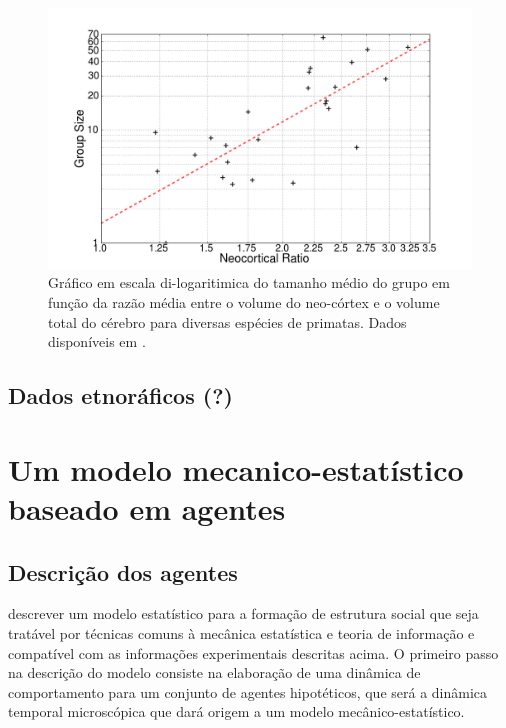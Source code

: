 \begin{figure}
	\centering
	\includegraphics[width = 1.1\textwidth]{figuras/dunbar.png}
	\caption{ Gráfico em escala di-logaritimica do tamanho médio do grupo em função da razão média entre o volume do neo-córtex e o volume total do cérebro para diversas espécies de primatas. Dados disponíveis em \citep{Dunbar2009}.}
	\label{fig:dunbarlaw}
\end{figure}

\subsection{Dados etnoráficos (?)}
\section{Um modelo mecanico-estatístico baseado em agentes}
\subsection{Descrição dos agentes}

 descrever um modelo estatístico para a formação de estrutura social que seja tratável por técnicas comuns à mecânica estatística e teoria de informação e compatível com as informações experimentais descritas acima. O primeiro passo na descrição do modelo consiste na elaboração de uma dinâmica de comportamento para um conjunto de agentes hipotéticos, que será a dinâmica temporal microscópica que dará origem a um modelo mecânico-estatístico. 


